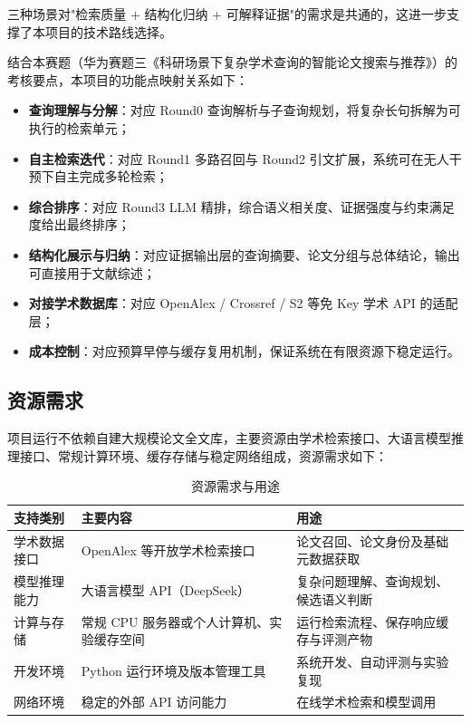 \documentclass[11pt,a4paper,fontset=macnew]{ctexart}
\begin{document}
三种场景对"检索质量 + 结构化归纳 + 可解释证据"的需求是共通的，这进一步支撑了本项目的技术路线选择。

结合本赛题（华为赛题三《科研场景下复杂学术查询的智能论文搜索与推荐》）的考核要点，本项目的功能点映射关系如下：

\begin{itemize}
  \item \textbf{查询理解与分解}：对应 Round0 查询解析与子查询规划，将复杂长句拆解为可执行的检索单元；
  \item \textbf{自主检索迭代}：对应 Round1 多路召回与 Round2 引文扩展，系统可在无人干预下自主完成多轮检索；
  \item \textbf{综合排序}：对应 Round3 LLM 精排，综合语义相关度、证据强度与约束满足度给出最终排序；
  \item \textbf{结构化展示与归纳}：对应证据输出层的查询摘要、论文分组与总体结论，输出可直接用于文献综述；
  \item \textbf{对接学术数据库}：对应 OpenAlex / Crossref / S2 等免 Key 学术 API 的适配层；
  \item \textbf{成本控制}：对应预算早停与缓存复用机制，保证系统在有限资源下稳定运行。
\end{itemize}

\subsection{资源需求}
\label{sec:resources}

项目运行不依赖自建大规模论文全文库，主要资源由学术检索接口、大语言模型推理接口、常规计算环境、缓存存储与稳定网络组成，资源需求如下：

\begin{table}[H]
\centering
\caption{资源需求与用途}
\label{tab:resources}
\small
\begin{tabular}{@{}lll@{}}
\toprule
\textbf{支持类别} & \textbf{主要内容} & \textbf{用途} \\
\midrule
学术数据接口 & OpenAlex 等开放学术检索接口 & 论文召回、论文身份及基础元数据获取 \\
模型推理能力 & 大语言模型 API（DeepSeek） & 复杂问题理解、查询规划、候选语义判断 \\
计算与存储 & 常规 CPU 服务器或个人计算机、实验缓存空间 & 运行检索流程、保存响应缓存与评测产物 \\
开发环境 & Python 运行环境及版本管理工具 & 系统开发、自动评测与实验复现 \\
网络环境 & 稳定的外部 API 访问能力 & 在线学术检索和模型调用 \\
\bottomrule
\end{tabular}
\end{table}
\end{document}
